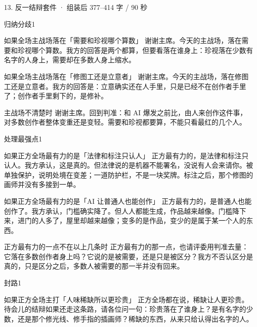 \documentclass[script,con]{debate}
\begin{document}
\begin{kit}{13. 反一结辩}{套件 · 组装后 377–414 字 / 90 秒}
\begin{pick}{归纳分歧}{1}
\begin{module}{如果全场主战场落在「需要和珍视哪个算数」}
谢谢主席。今天的主战场，落在需要和珍视哪个算数。我方的回答是两个都算，但要看落在谁身上：珍视落在少数有名字的人身上，需要却在多数人身上缩水。
\end{module}
\begin{module}{如果全场主战场落在「修图工还是立意者」}
谢谢主席。今天的主战场，落在修图工还是立意者。我方的回答是：立意确实还在人手里，只是已经不在创作者手里了；创作者手里剩下的，是修补。
\end{module}
\begin{fallback}{主战场不清楚时}
谢谢主席。回到判准：和 AI 爆发之前比，由人来创作这件事，对多数创作者整体变重还是变轻。需要和珍视都要算，不能只看最红的几个人。
\end{fallback}
\end{pick}
\begin{pick}{处理最强点}{1}
\begin{module}{如果正方全场最有力的是「法律和标注只认人」}
正方最有力的，是法律和标注只认人。我方承认，这是真的。但法律说的是机器不能署名，没说有人会来请你。被单独保护，说明处境在变差；一道防护栏，不是一块奖牌。标注之后，那个修图的画师并没有多接到一单。
\end{module}
\begin{module}{如果正方全场最有力的是「AI 让普通人也能创作」}
正方最有力的，是普通人也能创作了。我方承认，门槛确实降了。但人人都能生成，作品越来越像。门槛降下来，进门的人多了，屋里却越来越像；变多的是作品，变少的是属于某一个人的东西。
\end{module}
\begin{fallback}{正方最有力的一点不在以上几条时}
正方最有力的那一点，也请评委用判准去量：它落在多数创作者身上吗？它说的是被需要，还是只是被区分？我方不否认区分是真的，只是区分之后，多数人被需要的那一半并没有回来。
\end{fallback}
\end{pick}
\begin{pick}{封路}{1}
\begin{module}{如果正方全场主打「人味稀缺所以更珍贵」}
正方全场都在说，稀缺让人更珍贵。待会儿的结辩如果还走这条路，请各位问一句：珍贵落在了谁身上？是有名字的少数，还是那个修光线、修手指的插画师？稀缺的东西，从来只给认得出名字的人。
\end{module}

\end{pick}
\end{kit}
\end{document}
